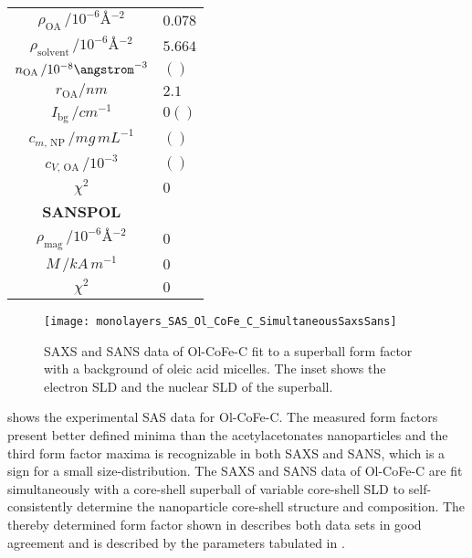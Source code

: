 \documentclass[\main/dresen_thesis.tex]{subfiles}
\begin{document}
\begin{table}[!htbp]
\begin{tabular}{ c | l }
        \rule{0pt}{2ex} $\rho_\mathrm{OA}      \, / \unit{10^{-6} \angstrom^{-2}}$   & $0.078$\\
        \rule{0pt}{2ex} $\rho_\mathrm{solvent} \, / \unit{10^{-6} \angstrom^{-2}}$   & $5.664$\\
        \hline
        \rule{0pt}{2ex} $n_\mathrm{OA} \, / 10^{-8} \angstrom^{-3}$                  & $()$ \\
        \rule{0pt}{2ex} $r_\mathrm{OA} / \unit{nm}$                                  & $2.1$\\
        \hline
        \rule{0pt}{2ex} $I_\mathrm{bg} \, / \unit{cm^{-1}}$                          & $0()$\\
        \hline
        \rule{0pt}{2ex} $c_{m, \, \mathrm{NP}} \, / \unit{mg\, mL^{-1}}$             & $()$\\
        \rule{0pt}{2ex} $c_{V, \, \mathrm{OA}} \, / \unit{10^{-3}}$                  & $()$\\
        \hline
        \rule{0pt}{2ex} $\chi^2$                                                     & $0$\\
        \hline
        \textbf{SANSPOL}\\
        \hline
        \rule{0pt}{2ex} $\rho_\mathrm{mag} \, / \unit{10^{-6} \angstrom^{-2}}$       & $0$\\
        \rule{0pt}{2ex} $M \, / \unit{kA \,m^{-1}}$                                  & $0$\\
        \hline
        \rule{0pt}{2ex} $\chi^2$                                                     & $0$\\
      \end{tabular}
    \end{table}


    \begin{figure}[tb]
      \centering
      \texttt{[image: monolayers\_SAS\_Ol\_CoFe\_C\_SimultaneousSaxsSans]}
      \caption{\label{fig:monolayers:nanoparticle:sas:OlCoFeC}SAXS and SANS data of Ol-CoFe-C fit to a superball form factor with a background of oleic acid micelles. The inset shows the electron SLD and the nuclear SLD of the superball. }
    \end{figure}

     shows the experimental SAS data for Ol-CoFe-C.
    The measured form factors present better defined minima than the acetylacetonates nanoparticles and the third form factor maxima is recognizable in both SAXS and SANS, which is a sign for a small size-distribution.
    The SAXS and SANS data of Ol-CoFe-C are fit simultaneously with a core-shell superball of variable core-shell SLD to self-consistently determine the nanoparticle core-shell structure and composition.
    The thereby determined form factor shown in  describes both data sets in good agreement and is described by the parameters tabulated in .
\end{document}
